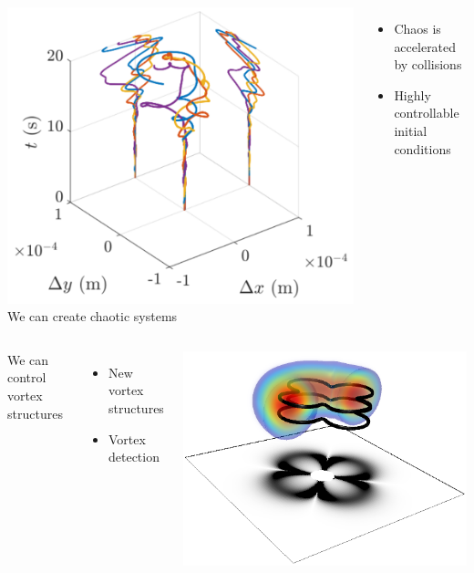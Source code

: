 \documentclass{beamer}
\begin{document}
\begin{frame}
\begin{columns}
\includegraphics[width=\textwidth]{../data/2d/evolution/evolution}
We can create chaotic systems
\begin{itemize}
\item Chaos is accelerated by collisions
\item Highly controllable initial conditions
\end{itemize}
\end{columns}

\begin{columns}
We can control vortex structures
\begin{itemize}
\item New vortex structures
\item Vortex detection
\end{itemize}
\includegraphics[width=\textwidth]{../data/3d/HE21_3d}
\end{columns}

\end{frame}
\end{document}
